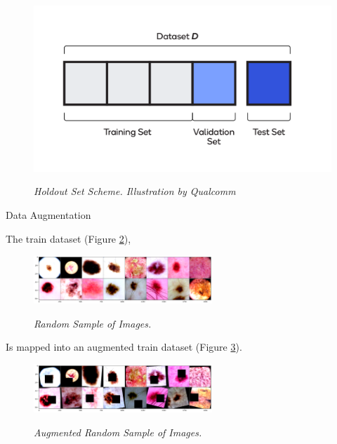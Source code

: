 \documentclass[dvipsnames,mathserif]{beamer}
\begin{document}
{\begin{frame}
      \begin{figure}[H]
        \centering
        \begin{adjustbox}{width=0.5\textwidth, trim={0cm 0.5cm 0cm 0.5cm}, clip}
          \includegraphics[width=\textwidth]{images/train-test-validation-sets.png}
        \end{adjustbox}
        \caption[Holdout Set Scheme]{\textit{Holdout Set Scheme. Illustration by Qualcomm}}
        {\label{fig:holdout-test-scheme}}
      \end{figure}

    \end{frame}

    \begin{frame}

      \large Data Augmentation
      \vspace{0.25cm}

      \footnotesize

      The train dataset (Figure \ref{fig:sample-of-datasets}),

      \begin{figure}[H]
        \centering
        \includegraphics[width=0.6\textwidth]{images/random-sample-of-isic.png}
        \caption[Random Sample of Images]{\footnotesize{\textit{Random Sample of Images.}}}
        {\label{fig:sample-of-datasets}}
      \end{figure}

      Is mapped into an augmented train dataset (Figure \ref{fig:aug-sample-of-datasets}).

      \begin{figure}[H]
        \centering
        \includegraphics[width=0.6\textwidth]{images/random-sample-of-isic-augmented.png}
        \caption[Augmented Random Sample of Images]{\footnotesize{\textit{Augmented Random Sample of Images.}}}
        {\label{fig:aug-sample-of-datasets}}
      \end{figure}


\end{frame}}
\end{document}
